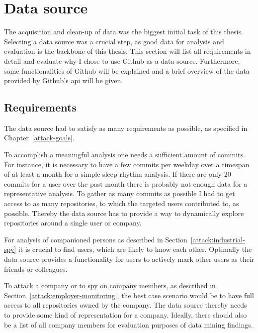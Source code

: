 \section{Data source}\label{data-source}
The acquisition and clean-up of data was the biggest initial task of this thesis.
Selecting a data source was a crucial step, as good data for analysis and evaluation is the backbone of this thesis.
This section will list all requirements in detail and evaluate why I chose to use Github as a data source.
Furthermore, some functionalities of Github will be explained and a brief overview of the data provided by Github's \ac{api} will be given.


\subsection{Requirements}\label{requirements}
The data source had to satisfy as many requirements as possible, as specified in Chapter~\ref{attack-goals}.

To accomplish a meaningful analysis one needs a sufficient amount of commits.
For instance, it is necessary to have a few commits per weekday over a timespan of at least a month for a simple sleep rhythm analysis.
If there are only 20 commits for a user over the past month there is probably not enough data for a representative analysis.
To gather as many commits as possible I had to get access to as many repositories, to which the targeted users contributed to, as possible.
Thereby the data source has to provide a way to dynamically explore repositories around a single user or company.

For analysis of companioned persons as described in Section~\ref{attack:industrial-spy} it is crucial to find users, which are likely to know each other.
Optimally the data source provides a functionality for users to actively mark other users as their friends or colleagues.

To attack a company or to spy on company members, as described in Section~\ref{attack:employer-monitoring}, the best case scenario would be to have full access to all repositories owned by the company.
The data source thereby needs to provide some kind of representation for a company.
Ideally, there should also be a list of all company members for evaluation purposes of data mining findings.


